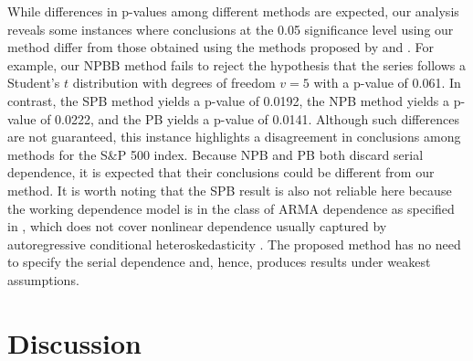 \documentclass[12pt]{article}
\begin{document}
While differences in p-values among different methods are expected, our analysis
reveals some instances where conclusions at the 0.05 significance level
using our method differ from those obtained using the methods proposed by
\citet{babu2004goodness} and \citet{zeimbekakis2022misuses}.
For example, our NPBB method fails to reject the
hypothesis that the series follows a Student's $t$ distribution with degrees of
freedom $v = 5$ with a p-value of 0.061. In contrast,
the SPB method yields a p-value of 0.0192,
the NPB method yields a p-value of 0.0222, and the PB yields a p-value of
0.0141. Although such differences are not guaranteed, this
instance highlights a disagreement in conclusions among methods for the S\&P 500
index. Because NPB and PB both discard serial dependence, it is expected that
their conclusions could be different from our method. It is worth noting that
the SPB result is also not reliable here because the working dependence model is
in the class of ARMA dependence as specified in \citet{zeimbekakis2022misuses},
which does not cover nonlinear dependence usually captured by autoregressive
conditional heteroskedasticity \citep{engle1995arch}. The proposed method has
no need to specify the serial dependence and, hence, produces results under
weakest assumptions.


\section{Discussion}\label{sec:conclusion}
\end{document}
